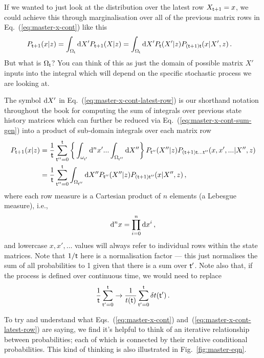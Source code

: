 If we wanted to just look at the distribution over the latest row $X_{{\sf t}+1}=x$, we could achieve this through marginalisation over all of the previous matrix rows in Eq.~(\ref{eq:master-x-cont}) like this
\begin{align}
P_{{\sf t}+1}(x\vert z) = \int_{\Omega_{{\sf t}}}{\rm d}X' P_{{\sf t}+1}(X\vert z) &= \int_{\Omega_{{\sf t}}}{\rm d}X' P_{{\sf t}}(X'\vert z) P_{({\sf t}+1){\sf t}}(x\vert X',z) \label{eq:master-x-cont-latest-row} \,.
\end{align}
But what is $\Omega_{\sf t}$? You can think of this as just the domain of possible matrix $X'$ inputs into the integral which will depend on the specific stochastic process we are looking at. 

The symbol ${\rm d}X'$ in Eq.~(\ref{eq:master-x-cont-latest-row}) is our shorthand notation throughout the book for computing the sum of integrals over previous state history matrices which can further be reduced via Eq.~(\ref{eq:master-x-cont-sum-gen}) into a product of sub-domain integrals over each matrix row
\begin{align}
P_{{\sf t}+1}(x\vert z) &= \frac{1}{{\sf t}}\sum_{{\sf t}''=0}^{{\sf t}} \bigg\lbrace \int_{\omega_{{\sf t}'}}{\rm d}^nx'...\int_{\Omega_{{\sf t}''}}{\rm d}X'' \bigg\rbrace \,P_{{\sf t}''}(X''\vert z) P_{({\sf t}+1){\sf t}\dots{\sf t}''}(x,x',... \vert X'',z) \\
&= \frac{1}{{\sf t}}\sum_{{\sf t}''=0}^{{\sf t}} \int_{\Omega_{{\sf t}''}}{\rm d}X'' P_{{\sf t}''}(X''\vert z) P_{({\sf t}+1){\sf t}''}(x \vert X'',z) \label{eq:master-x-cont-latest-row-gen} \,,
\end{align}
where each row measure is a Cartesian product of $n$ elements (a Lebesgue measure), i.e.,
\begin{align}
{\rm d}^nx = \prod_{i=0}^n{\rm d}x^i \,,
\end{align}
and lowercase $x, x', \dots$ values will always refer to individual rows within the state matrices. Note that $1/{\sf t}$ here is a normalisation factor --- this just normalises the sum of all probabilities to 1 given that there is a sum over ${\sf t}'$. Note also that, if the process is defined over continuous time, we would need to replace 
\begin{align}
\frac{1}{{\sf t}}\sum_{{\sf t}'=0}^{{\sf t}} \rightarrow \frac{1}{t({\sf t})}\sum_{{\sf t}'=0}^{{\sf t}}\delta t({\sf t}') \,.
\end{align}

To try and understand what Eqs.~(\ref{eq:master-x-cont}) and~(\ref{eq:master-x-cont-latest-row}) are saying, we find it's helpful to think of an iterative relationship between probabilities; each of which is connected by their relative conditional probabilities. This kind of thinking is also illustrated in Fig.~\ref{fig:master-eqn}.

